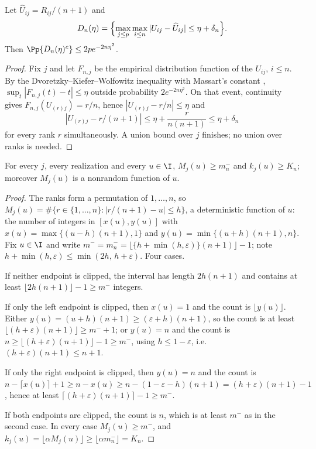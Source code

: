 \begin{lemma}\label{lem:app-dkw}
Let $\widehat U_{ij}=R_{ij}/(n+1)$ and
\[
 D_n(\eta)=\Bigl\{\max_{j\le p}\max_{i\le n}
 |U_{ij}-\widehat U_{ij}|\le\eta+\delta_n\Bigr\}.
\]
Then $\Pp\{D_n(\eta)^c\}\le2pe^{-2n\eta^2}$.
\end{lemma}

\begin{proof}
Fix $j$ and let $F_{n,j}$ be the empirical distribution function of the
$U_{ij}$, $i\le n$.  By the Dvoretzky--Kiefer--Wolfowitz inequality with
Massart's constant \citep{massart1990},
$\sup_t|F_{n,j}(t)-t|\le\eta$ outside probability
$2e^{-2n\eta^2}$.  On that event, continuity gives
$F_{n,j}(U_{(r)j})=r/n$, hence $|U_{(r)j}-r/n|\le\eta$ and
\[
 |U_{(r)j}-r/(n+1)|\le\eta+\frac{r}{n(n+1)}\le\eta+\delta_n
\]
for every rank $r$ simultaneously.  A union bound over $j$ finishes; no
union over ranks is needed.
\end{proof}

\begin{lemma}\label{lem:app-counts}
For every $j$, every realization and every $u\in\I$,
$M_j(u)\ge m_n^-$ and $k_j(u)\ge K_n$; moreover $M_j(u)$ is a nonrandom
function of $u$.
\end{lemma}

\begin{proof}
The ranks form a permutation of $1,\ldots,n$, so
$M_j(u)=\#\{r\in\{1,\ldots,n\}:|r/(n+1)-u|\le h\}$, a deterministic
function of $u$: the number of integers in
$[x(u),y(u)]$ with $x(u)=\max\{(u-h)(n+1),1\}$ and
$y(u)=\min\{(u+h)(n+1),n\}$.  Fix $u\in\I$ and write
$m^-=m_n^-=\lfloor\{h+\min(h,\varepsilon)\}(n+1)\rfloor-1$; note
$h+\min(h,\varepsilon)\le\min(2h,\,h+\varepsilon)$.  Four cases.

If neither endpoint is clipped, the interval has length $2h(n+1)$ and
contains at least $\lfloor2h(n+1)\rfloor-1\ge m^-$ integers.

If only the left endpoint is clipped, then $x(u)=1$ and the count is
$\lfloor y(u)\rfloor$.  Either $y(u)=(u+h)(n+1)\ge(\varepsilon+h)(n+1)$,
so the count is at least
$\lfloor(h+\varepsilon)(n+1)\rfloor\ge m^-+1$; or $y(u)=n$ and the count
is $n\ge\lfloor(h+\varepsilon)(n+1)\rfloor-1\ge m^-$, using
$h\le1-\varepsilon$, i.e.\ $(h+\varepsilon)(n+1)\le n+1$.

If only the right endpoint is clipped, then $y(u)=n$ and the count is
$n-\lceil x(u)\rceil+1\ge n-x(u)\ge n-(1-\varepsilon-h)(n+1)
=(h+\varepsilon)(n+1)-1$, hence at least
$\lceil(h+\varepsilon)(n+1)\rceil-1\ge m^-$.

If both endpoints are clipped, the count is $n$, which is at least
$m^-$ as in the second case.  In every case $M_j(u)\ge m^-$, and
$k_j(u)=\lfloor\alpha M_j(u)\rfloor\ge\lfloor\alpha m_n^-\rfloor=K_n$.
\end{proof}

